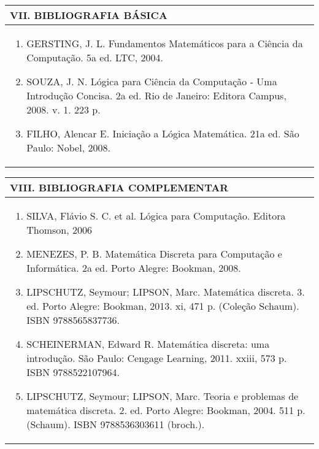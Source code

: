 \documentclass[12pt]{article}
\begin{document}

\begin{longtable}{|L{1.025\textwidth}|} \hline
%
{\bf VII. BIBLIOGRAFIA BÁSICA} \\ \hline
\begin{enumerate}
%
\item GERSTING, J. L. Fundamentos Matemáticos para a Ciência da Computação. 5a ed. LTC, 2004. 
\item SOUZA, J. N. Lógica para Ciência da Computação - Uma Introdução Concisa. 2a ed. Rio de Janeiro: Editora Campus, 2008. v. 1. 223 p. 
\item FILHO, Alencar E. Iniciação a Lógica Matemática. 21a ed. São Paulo: Nobel, 2008.
\end{enumerate}
 \\ \hline
\end{longtable}


\newpage

\begin{longtable}{|L{1.025\textwidth}|} \hline
%
{\bf VIII. BIBLIOGRAFIA COMPLEMENTAR} \\ \hline
\begin{enumerate}
\item SILVA, Flávio S. C. et al. Lógica para Computação. Editora Thomson, 2006 
\item MENEZES, P. B. Matemática Discreta para Computação e Informática. 2a ed. Porto Alegre: Bookman, 2008.
\item LIPSCHUTZ, Seymour; LIPSON, Marc. Matemática discreta. 3. ed. Porto Alegre: Bookman, 2013. xi, 471 p. (Coleção Schaum). ISBN 9788565837736.
\item SCHEINERMAN, Edward R. Matemática discreta: uma introdução. São Paulo: Cengage Learning, 2011. xxiii, 573 p. ISBN 9788522107964.
\item LIPSCHUTZ, Seymour; LIPSON, Marc. Teoria e problemas de matemática discreta. 2. ed. Porto Alegre: Bookman, 2004. 511 p. (Schaum). ISBN 9788536303611 (broch.).
\end{enumerate}
 \\ \hline
\end{longtable}



\end{document}
